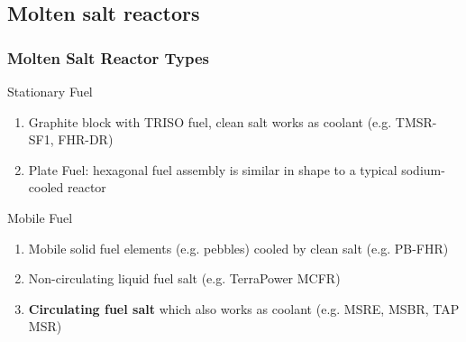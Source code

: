 \subsection{Molten salt reactors}
\begin{frame}
  \frametitle{Molten Salt Reactor Types}
                  \vspace*{-0.1in}
              \begin{block}{Stationary Fuel}
               \begin{enumerate}
                \item Graphite block with TRISO fuel, clean salt works as coolant (e.g. TMSR-SF1, FHR-DR)
                \item Plate Fuel: hexagonal fuel assembly is similar in shape to a typical sodium-cooled reactor
               \end{enumerate}
               \end{block}
               
               \begin{block}{Mobile Fuel}
               \begin{enumerate}
                \item Mobile solid fuel elements (e.g. pebbles) cooled by clean salt (e.g. PB-FHR)
                \item Non-circulating liquid fuel salt (e.g. TerraPower MCFR) 
                \item \textbf{Circulating fuel salt} which also works as coolant (e.g. \gls{MSRE}, \gls{MSBR}, TAP MSR)
               \end{enumerate}
               \end{block}
\end{frame}

